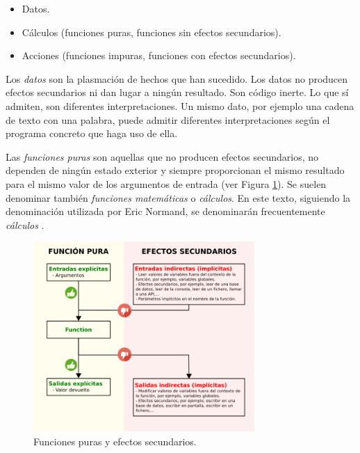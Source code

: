 \begin{itemize}
   \item Datos.
   \item Cálculos (funciones puras, funciones sin efectos secundarios).
   \item Acciones (funciones impuras, funciones con efectos secundarios).
\end{itemize}

Los \textit{datos} son la plasmación de hechos que han sucedido. Los datos no producen efectos secundarios ni dan lugar a ningún resultado. Son código inerte. Lo que sí admiten, son diferentes interpretaciones. Un mismo dato, por ejemplo una cadena de texto con una palabra, puede admitir diferentes interpretaciones según el programa concreto que haga uso de ella.

Las \textit{funciones puras} son aquellas que no producen efectos secundarios, no dependen de ningún estado exterior y siempre proporcionan el mismo resultado para el mismo valor de los argumentos de entrada (ver Figura \ref{fig_funcion_pura}). Se suelen denominar también \textit{funciones matemáticas} o \textit{cálculos}. En este texto, siguiendo la denominación utilizada por Eric Normand, se denominarán frecuentemente \textit{cálculos} \citep{normandGrokkingSimplicityTaming2021}.

\vspace{0.7em}
\begin{figure}[htb]
   \begin{center}
      \includegraphics[width=0.75\textwidth]{img/funcion_pura.png}
      \caption{Funciones puras y efectos secundarios.}
      \label{fig_funcion_pura}
   \end{center}
\end{figure}

